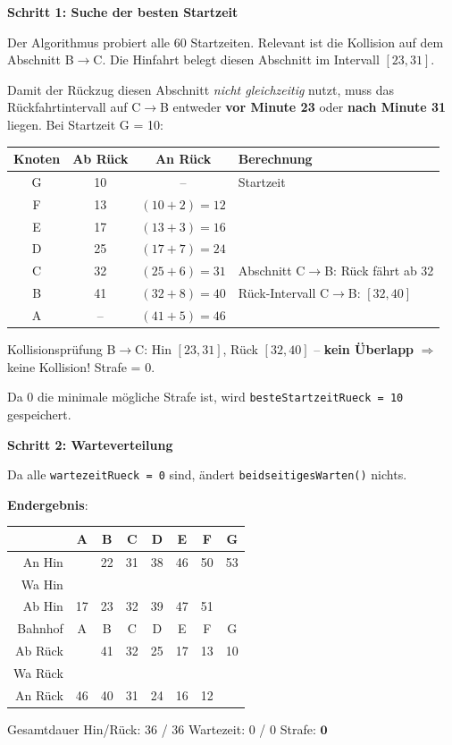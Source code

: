 \documentclass[12pt,a4paper]{article}
\begin{document}
\begin{beispielbox}[title={Beidseitiges Warten -- Beispiel2: A--B--C--D--E--F--G, Abstände: 5 8 6 7 3 2, Start: 17}]

\textbf{Schritt 1: Suche der besten Startzeit}

Der Algorithmus probiert alle 60 Startzeiten. Relevant ist die Kollision auf dem Abschnitt B$\to$C. Die Hinfahrt belegt diesen Abschnitt im Intervall $[23, 31]$.

Damit der Rückzug diesen Abschnitt \emph{nicht gleichzeitig} nutzt, muss das Rückfahrtintervall auf C$\to$B entweder \textbf{vor Minute 23} oder \textbf{nach Minute 31} liegen. Bei Startzeit G = 10:

\begin{center}
\begin{tabular}{c|cc|p{6cm}}
\toprule
\textbf{Knoten} & \textbf{Ab Rück} & \textbf{An Rück} & \textbf{Berechnung} \\
\midrule
G & 10 & -- & Startzeit \\
F & 13 & $(10+2)=12$ & \\
E & 17 & $(13+3)=16$ & \\
D & 25 & $(17+7)=24$ & \\
C & 32 & $(25+6)=31$ & Abschnitt C$\to$B: Rück fährt ab 32 \\
B & 41 & $(32+8)=40$ & Rück-Intervall C$\to$B: $[32, 40]$ \\
A & -- & $(41+5)=46$ & \\
\bottomrule
\end{tabular}
\end{center}

Kollisionsprüfung B$\to$C: Hin $[23,31]$, Rück $[32, 40]$ -- \textbf{kein Überlapp} $\Rightarrow$ keine Kollision! Strafe = 0.

Da 0 die minimale mögliche Strafe ist, wird \texttt{besteStartzeitRueck = 10} gespeichert.

\textbf{Schritt 2: Warteverteilung}

Da alle \texttt{wartezeitRueck = 0} sind, ändert \texttt{beidseitigesWarten()} nichts.

\textbf{Endergebnis}:
\begin{center}
\begin{tabular}{r|ccccccc}
 & A & B & C & D & E & F & G \\
\hline
An Hin  &    & 22 & 31 & 38 & 46 & 50 & 53 \\
Wa Hin  &    &    &    &    &    &    &    \\
Ab Hin  & 17 & 23 & 32 & 39 & 47 & 51 &    \\
\hline
Bahnhof & A  & B  & C  & D  & E  & F  & G  \\
\hline
Ab Rück &    & 41 & 32 & 25 & 17 & 13 & 10 \\
Wa Rück &    &    &    &    &    &    &    \\
An Rück & 46 & 40 & 31 & 24 & 16 & 12 &    \\
\end{tabular}
\end{center}

Gesamtdauer Hin/Rück: 36 / 36 \quad Wartezeit: 0 / 0 \quad Strafe: $\mathbf{0}$
\end{beispielbox}
\end{document}
